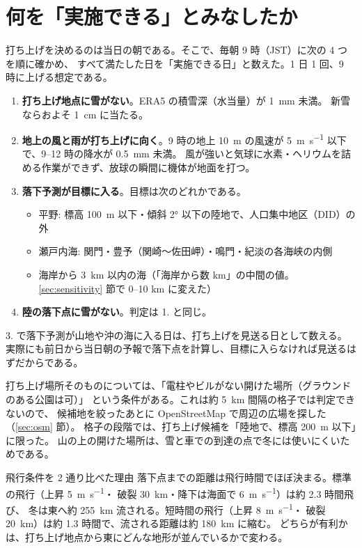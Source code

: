 \section{何を「実施できる」とみなしたか}
\label{sec:conditions}

打ち上げを決めるのは当日の朝である。そこで、毎朝 9 時（JST）に次の 4 つを順に確かめ、
すべて満たした日を「実施できる日」と数えた。1 日 1 回、9 時に上げる想定である。

\begin{enumerate}
  \item \textbf{打ち上げ地点に雪がない}。ERA5 の積雪深（水当量）が \SI{1}{\milli\metre} 未満。
    新雪ならおよそ \SI{1}{\centi\metre} に当たる。
  \item \textbf{地上の風と雨が打ち上げに向く}。9 時の地上 \SI{10}{\metre} の風速が
    \SI{5}{\metre\per\second} 以下で、9--12 時の降水が \SI{0.5}{\milli\metre} 未満。
    風が強いと気球に水素・ヘリウムを詰める作業ができず、放球の瞬間に機体が地面を打つ。
  \item \textbf{落下予測が目標に入る}。目標は次のどれかである。
    \begin{itemize}
      \item 平野: 標高 \SI{100}{\metre} 以下・傾斜 \ang{2} 以下の陸地で、人口集中地区（DID）の外
      \item 瀬戸内海: 関門・豊予（関崎〜佐田岬）・鳴門・紀淡の各海峡の内側
      \item 海岸から \SI{3}{\kilo\metre} 以内の海（「海岸から数 km」の中間の値。\ref{sec:sensitivity} 節で 0--10 km に変えた）
    \end{itemize}
  \item \textbf{陸の落下点に雪がない}。判定は 1. と同じ。
\end{enumerate}

3. で落下予測が山地や沖の海に入る日は、打ち上げを見送る日として数える。
実際にも前日から当日朝の予報で落下点を計算し、目標に入らなければ見送るはずだからである。

打ち上げ場所そのものについては、「電柱やビルがない開けた場所（グラウンドのある公園は可）」
という条件がある。これは約 \SI{5}{\kilo\metre} 間隔の格子では判定できないので、
候補地を絞ったあとに OpenStreetMap で周辺の広場を探した（\ref{sec:osm} 節）。
格子の段階では、打ち上げ候補を「陸地で、標高 \SI{200}{\metre} 以下」に限った。
山の上の開けた場所は、雪と車での到達の点で冬には使いにくいためである。

\begin{whybox}{飛行条件を 2 通り比べた理由}
落下点までの距離は飛行時間でほぼ決まる。標準の飛行（上昇 \SI{5}{\metre\per\second}・
破裂 \SI{30}{\kilo\metre}・降下は海面で \SI{6}{\metre\per\second}）は約 2.3 時間飛び、
冬は東へ約 \SI{255}{\kilo\metre} 流される。短時間の飛行（上昇 \SI{8}{\metre\per\second}・
破裂 \SI{20}{\kilo\metre}）は約 1.3 時間で、流される距離は約 \SI{180}{\kilo\metre} に縮む。
どちらが有利かは、打ち上げ地点から東にどんな地形が並んでいるかで変わる。
\end{whybox}
